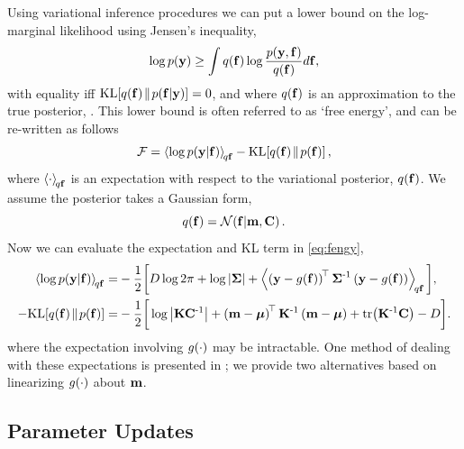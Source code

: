 \documentclass{article} %
\begin{document}
Using variational inference procedures we can put a lower bound on the
log-marginal likelihood using Jensen's inequality, 
\begin{equation}
    \log p\!\left({\mathbf{y}}\right) \geq \int q\!\left({\mathbf{f}}\right) \log 
        \frac{p\!\left({\mathbf{y}, \mathbf{f}}\right)}{q\!\left({\mathbf{f}}\right)} d\mathbf{f},
\end{equation}
with equality iff $\text{KL}\!\left[{{q\!\left({\mathbf{f}}\right)}\!\parallel\!{p\!\left({\mathbf{f}}\middle\vert{\ensuremath{\mathbf{y}}}\right)}}\right] = 0$, and where
$q\!\left({\mathbf{f}}\right)$ is an approximation to the true posterior,
\probC{\lstate}{\obs}. This lower bound is often referred to as `free energy',
and can be re-written as follows
\begin{equation}
    \mathcal{F} = \left\langle{\log \ensuremath{p\!\left({\mathbf{y}}\middle\vert{\ensuremath{\mathbf{f}}}\right)}}\right\rangle_{\!{q\mathbf{f}}}
        - \text{KL}\!\left[{{q\!\left({\mathbf{f}}\right)}\!\parallel\!{p\!\left({\mathbf{f}}\right)}}\right],
    \label{eq:fengy}
\end{equation}
where $\left\langle{\cdot}\right\rangle_{\!{q\mathbf{f}}}$ is an expectation with respect to the
variational posterior, $q\!\left({\mathbf{f}}\right)$. We assume the posterior takes a
Gaussian form,
\begin{equation}
    q\!\left({\mathbf{f}}\right) = \mathcal{N}\!\left({\mathbf{f}}\middle\vert{\ensuremath{\mathbf{m}}, \ensuremath{\mathbf{C}}}\right). \label{eq:varpost}
\end{equation}
Now we can evaluate the expectation and KL term in \eqref{eq:fengy},
\begin{align}
    \expec{q\lstate}{\log \probC{\obs}{\lstate}}
        =& - \frac{1}{2} \bigg[ 
            D\log{2\pi} + \log\deter{\lcov} 
            + \expec{q\lstate}{\brac{\obs - \nonlin{\lstate}}\transpose\lcov\inv
            \brac{\obs - \nonlin{\lstate}}}\bigg],
            \label{eq:qlike} \\
     - \KL{\qrob{\lstate}}{\prob{\lstate}}
        =& - \frac{1}{2} \bigg[\log\deter{\prcov\pocov\inv}
            + \brac{\pomean - \prmean}\transpose\prcov\inv
            \brac{\pomean - \prmean}
            + \trace{\prcov\inv\pocov} - D\bigg] \label{eq:qkl}.
\end{align}
where the expectation involving $g\!\left({{\cdot}}\right)$ may be intractable. One method
of dealing with these expectations is presented in \cite{Opper2009}; we provide
two alternatives based on linearizing $g\!\left({{\cdot}}\right)$ about $\mathbf{m}$.


\subsection{Parameter Updates}
\end{document}
